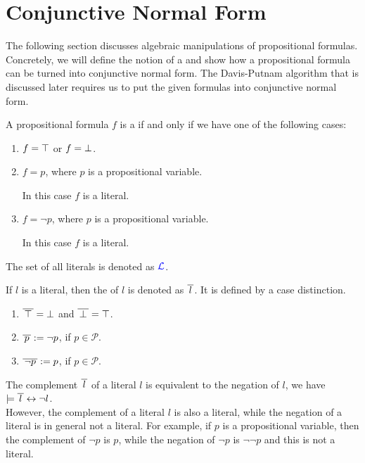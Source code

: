 \section{Conjunctive Normal Form}
The following section discusses algebraic manipulations of propositional formulas.  Concretely, we will define
the notion of a  and show how a propositional formula can be turned into
conjunctive normal form.  The Davis-Putnam algorithm that is discussed later requires us to put the given
formulas into conjunctive normal form.

\begin{Definition}[Literal]
  A propositional formula $f$ is a  if and only if we have one of the following cases: 
  \begin{enumerate}
  \item $f = \top$ or $f = \bot$.
  \item $f = p$, where $p$ is a propositional variable.

        In this case $f$ is a  literal.
  \item $f = \neg p$, where $p$ is a propositional variable. 

        In this case $f$ is a  literal.
  \end{enumerate}
  The set of all literals is denoted as  ${\color{blue}\mathcal{L}}$.  \eox
\end{Definition}

If  $l$ is a literal, then the  of $l$ is denoted as $\overline{\,l\,}$.
It is defined by a case distinction.
\begin{enumerate}
\item $\overline{\,\top\,} = \bot$ \quad and \quad $\overline{\,\bot\,} = \top$. 
\item $\overline{\,p\,} := \neg p$, \quad if $p \in \mathcal{P}$.
\item $\overline{\,\neg p\,} := p$, \quad if $p \in \mathcal{P}$.
\end{enumerate}
The complement $\overline{\,l\,}$ of a literal $l$ is equivalent to the negation of $l$, we have
\\[0.2cm]
\hspace*{1.3cm}
$\models \overline{\,l\,} \leftrightarrow \neg l$.
\\[0.2cm]
However, the complement of a literal $l$ is also a literal, while the negation of a literal is in general not a
literal. For example, if $p$ is a propositional variable, then the complement of $\neg p$ is $p$, while the
negation of $\neg p$ is $\neg \neg p$ and this is not a literal.

